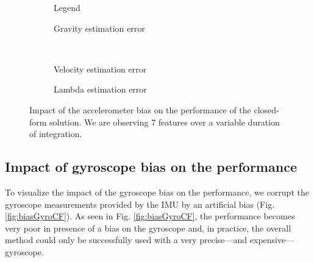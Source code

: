 \documentclass[letterpaper, 10 pt, journal, final]{ieeeconf}  %
\begin{document}
\begin{figure}
  \centering
        \hspace{0.2\columnwidth}%
        \begin{subfigure}[b]{0.3\columnwidth}
                \resizebox{\columnwidth}{!}{}
                \caption{Legend}

        \end{subfigure}%
        \begin{subfigure}[b]{0.5\columnwidth}
                \resizebox{\columnwidth}{!}{}
                \caption{Gravity estimation error}

        \end{subfigure}
        ~
        \begin{subfigure}[b]{0.5\columnwidth}
                \resizebox{\columnwidth}{!}{}
                \caption{Velocity estimation error}

        \end{subfigure}%
        \begin{subfigure}[b]{0.5\columnwidth}
                \resizebox{\columnwidth}{!}{}
                \caption{Lambda estimation error}

        \end{subfigure}
        \caption{Impact of the accelerometer bias on the performance of the closed-form solution. We are observing 7 features  over a variable duration of integration.\label{fig:biasAccCF}}
\end{figure}



\subsection{Impact of gyroscope bias on the performance}
To visualize the impact of the gyroscope bias on the performance,
we corrupt the gyroscope measurements provided by the IMU by an artificial bias (Fig. \ref{fig:biasGyroCF}).
As seen in Fig. \ref{fig:biasGyroCF}, the performance becomes very poor in presence of a bias on the gyroscope and, in practice, the overall method could only be successfully used with a very precise---and expensive---gyroscope.

\end{document}
